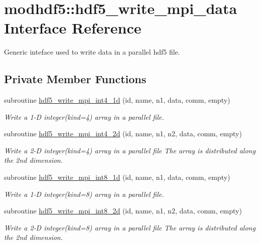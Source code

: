 \hypertarget{interfacemodhdf5_1_1hdf5__write__mpi__data}{\section{modhdf5\-:\-:hdf5\-\_\-write\-\_\-mpi\-\_\-data Interface Reference}
\label{interfacemodhdf5_1_1hdf5__write__mpi__data}
}


Generic inteface used to write data in a parallel hdf5 file.  


\subsection*{Private Member Functions}
\begin{DoxyCompactItemize}
\item 
subroutine \hyperlink{interfacemodhdf5_1_1hdf5__write__mpi__data_a7ea09115ff2a974a7d871c555b1be2d0}{hdf5\-\_\-write\-\_\-mpi\-\_\-int4\-\_\-1d} (id, name, n1, data, comm, empty)
\begin{DoxyCompactList}\small\item\em Write a 1-\/\-D integer(kind=4) array in a parallel file. \end{DoxyCompactList}\item 
subroutine \hyperlink{interfacemodhdf5_1_1hdf5__write__mpi__data_a2906d576070456a5137a6e0abe667156}{hdf5\-\_\-write\-\_\-mpi\-\_\-int4\-\_\-2d} (id, name, n1, n2, data, comm, empty)
\begin{DoxyCompactList}\small\item\em Write a 2-\/\-D integer(kind=4) array in a parallel file The array is distributed along the 2nd dimension. \end{DoxyCompactList}\item 
subroutine \hyperlink{interfacemodhdf5_1_1hdf5__write__mpi__data_a9e1ae706eda63ff5c0be30ee69ec560a}{hdf5\-\_\-write\-\_\-mpi\-\_\-int8\-\_\-1d} (id, name, n1, data, comm, empty)
\begin{DoxyCompactList}\small\item\em Write a 1-\/\-D integer(kind=8) array in a parallel file. \end{DoxyCompactList}\item 
subroutine \hyperlink{interfacemodhdf5_1_1hdf5__write__mpi__data_a16185b9e0e6ab2aaaff9c931f4554e3a}{hdf5\-\_\-write\-\_\-mpi\-\_\-int8\-\_\-2d} (id, name, n1, n2, data, comm, empty)
\begin{DoxyCompactList}\small\item\em Write a 2-\/\-D integer(kind=8) array in a parallel file The array is distributed along the 2nd dimension. \end{DoxyCompactList}\item 

\end{DoxyCompactItemize}
